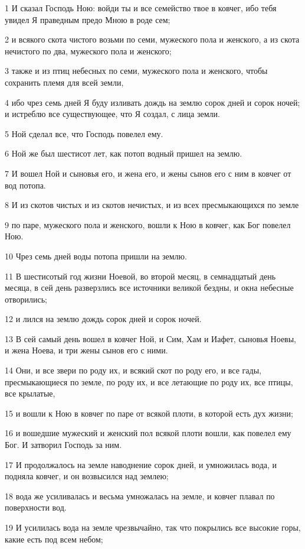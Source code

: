 \par 1 И сказал Господь Ною: войди ты и все семейство твое в ковчег, ибо тебя увидел Я праведным предо Мною в роде сем;
\par 2 и всякого скота чистого возьми по семи, мужеского пола и женского, а из скота нечистого по два, мужеского пола и женского;
\par 3 также и из птиц небесных по семи, мужеского пола и женского, чтобы сохранить племя для всей земли,
\par 4 ибо чрез семь дней Я буду изливать дождь на землю сорок дней и сорок ночей; и истреблю все существующее, что Я создал, с лица земли.
\par 5 Ной сделал все, что Господь повелел ему.
\par 6 Ной же был шестисот лет, как потоп водный пришел на землю.
\par 7 И вошел Ной и сыновья его, и жена его, и жены сынов его с ним в ковчег от вод потопа.
\par 8 И из скотов чистых и из скотов нечистых, и из всех пресмыкающихся по земле
\par 9 по паре, мужеского пола и женского, вошли к Ною в ковчег, как Бог повелел Ною.
\par 10 Чрез семь дней воды потопа пришли на землю.
\par 11 В шестисотый год жизни Ноевой, во второй месяц, в семнадцатый день месяца, в сей день разверзлись все источники великой бездны, и окна небесные отворились;
\par 12 и лился на землю дождь сорок дней и сорок ночей.
\par 13 В сей самый день вошел в ковчег Ной, и Сим, Хам и Иафет, сыновья Ноевы, и жена Ноева, и три жены сынов его с ними.
\par 14 Они, и все звери по роду их, и всякий скот по роду его, и все гады, пресмыкающиеся по земле, по роду их, и все летающие по роду их, все птицы, все крылатые,
\par 15 и вошли к Ною в ковчег по паре от всякой плоти, в которой есть дух жизни;
\par 16 и вошедшие мужеский и женский пол всякой плоти вошли, как повелел ему Бог. И затворил Господь за ним.
\par 17 И продолжалось на земле наводнение сорок дней, и умножилась вода, и подняла ковчег, и он возвысился над землею;
\par 18 вода же усиливалась и весьма умножалась на земле, и ковчег плавал по поверхности вод.
\par 19 И усилилась вода на земле чрезвычайно, так что покрылись все высокие горы, какие есть под всем небом;
